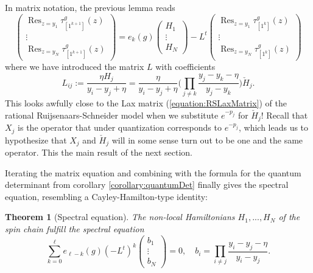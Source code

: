 \documentclass[11pt]{report}
\newtheorem{theorem}{Theorem}[section]
\theoremstyle{definition}
\theoremstyle{remark}
\theoremstyle{remark}
\begin{document}
In matrix notation, the previous lemma reads
\begin{equation*}
\begin{pmatrix}
\operatorname{Res}_{z=y_1} \tau_{[1^{k+1}]}^g(z) \\
\vdots \\
\operatorname{Res}_{z=y_N} \tau_{[1^{k+1}]}^g(z)
\end{pmatrix}
=
e_k(g)
\begin{pmatrix}
H_1 \\
\vdots \\
H_N
\end{pmatrix}
-L^t
\begin{pmatrix}
\operatorname{Res}_{z=y_1} \tau_{[1^k]}^g(z) \\
\vdots \\
\operatorname{Res}_{z=y_N} \tau_{[1^k]}^g(z)
\end{pmatrix}
\end{equation*}
where we have introduced the matrix $L$ with coefficients
\begin{equation*}
L_{ij} := \frac{\eta H_j}{y_i-y_j+\eta} = \frac{\eta}{y_i-y_j+\eta} \bigg( \prod_{j \neq k} \frac{y_j-y_k-\eta}{y_j-y_k} \bigg) \check H_j.
\end{equation*}
This looks awfully close to the Lax matrix (\ref{equation:RSLaxMatrix}) of the rational Ruijsenaars-Schneider model when we substitute $e^{-p_j}$ for $\check H_j$! Recall that $X_j$ is the operator that under quantization corresponds to $e^{-p_j}$, which leads us to hypothesize that $X_j$ and $\check H_j$ will in some sense turn out to be one and the same operator. This the main result of the next section.

Iterating the matrix equation and combining with the formula for the quantum determinant from corollary \ref{corollary:quantumDet} finally gives the spectral equation, resembling a Cayley-Hamilton-type identity:

\begin{theorem}[Spectral equation]\label{theorem:spectralEq}
The non-local Hamiltonians $H_1,...,H_N$ of the spin chain fulfill the \emph{spectral equation}
\begin{equation}\label{equation:spectralEq}
\sum_{k=0}^\ell e_{\ell-k}(g) (-L^t)^k
\begin{pmatrix}
b_1 \\ \vdots \\ b_N
\end{pmatrix}
= 0, \quad b_i = \prod_{i \neq j} \frac{y_i-y_j-\eta}{y_i-y_j}.
\end{equation}
\end{theorem}
\end{document}
